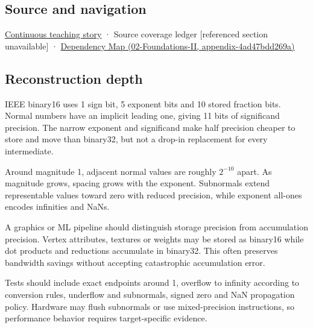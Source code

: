 \subsection{Source and navigation}\label{appendix-34443cec7170-source-and-navigation}

\hyperref[01-foundations-i-ch001-choosing-what-information-to-keep]{Continuous teaching story} · {Source coverage ledger {[}referenced section unavailable{]}} · \href{../02-Foundations-II/main.pdf\#nameddest=appendix-4ad47bdd269a}{Dependency Map (02-Foundations-II, appendix-4ad47bdd269a)}

\subsection{Reconstruction depth}\label{appendix-34443cec7170-reconstruction-depth}

IEEE binary16 uses 1 sign bit, 5 exponent bits and 10 stored fraction bits. Normal numbers have an implicit leading one, giving 11 bits of significand precision. The narrow exponent and significand make half precision cheaper to store and move than binary32, but not a drop-in replacement for every intermediate.

Around magnitude 1, adjacent normal values are roughly \(2^{-10}\) apart. As magnitude grows, spacing grows with the exponent. Subnormals extend representable values toward zero with reduced precision, while exponent all-ones encodes infinities and NaNs.

A graphics or ML pipeline should distinguish storage precision from accumulation precision. Vertex attributes, textures or weights may be stored as binary16 while dot products and reductions accumulate in binary32. This often preserves bandwidth savings without accepting catastrophic accumulation error.

Tests should include exact endpoints around 1, overflow to infinity according to conversion rules, underflow and subnormals, signed zero and NaN propagation policy. Hardware may flush subnormals or use mixed-precision instructions, so performance behavior requires target-specific evidence.
